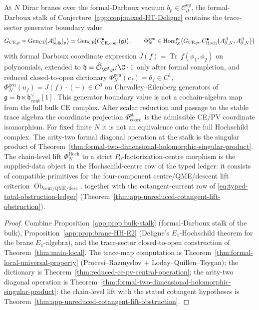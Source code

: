 \begin{thm}\label{app:thm:stalk-of-conj}
At $N$ Dirac branes over the formal-Darboux vacuum
$b_p\in\mathcal{C}^{\mathrm{op}}_\partial$, the formal-Darboux stalk
of Conjecture~\ref{app:conj:mixed-HT-Deligne} contains the
trace-sector generator boundary value
\[
  G_{\mathrm{CE},p}=
  \operatorname{Gen}_{\mathrm{CE}}\!
  \bigl(\mathcal A^{\mathrm{cl}}_{\mathrm{bulk}}|_p\bigr)
   \simeq
	   \operatorname{Gen}_{\mathrm{CE}}\!
	   \bigl(C^\bullet_{\mathrm{CE},\mathrm{cont}}(\mathfrak g)\bigr),
  \qquad
  \Phi_N^{\mathrm{gen}}\in
  \operatorname{Hom}^{\mathrm{gr}}_\C\!\left(
    G_{\mathrm{CE},p},
    C^\bullet_{\mathrm{Hoch}}\bigl(A^{\mathrm{cl}}_{\partial,N},
    A^{\mathrm{cl}}_{\partial,N}\bigr)
  \right)
\]
with formal Darboux coordinate expression
\(J(f)=\overline{\operatorname{Tr}\,f(\phi_1,\phi_2)}\) on polynomials,
extended to
\(\mathfrak h=\widehat{\mathcal O}_{\C^2,p}/\C\cdot 1\) only after
formal completion, and reduced closed-to-open dictionary
\(\Phi_N^{\mathrm{gen}}(c_f)=\theta_f\in C^1\),
\(\Phi_N^{\mathrm{gen}}(u_f)=J(f)\cdot(-)\in C^0\) on
Chevalley--Eilenberg generators of
$\mathfrak g=\mathfrak h\ltimes\mathfrak h^\vee_{\mathrm{cont}}[1]$.
This generator boundary value is not a cochain-algebra map from the
full bulk CE complex.  After scalar reduction and passage to the
stable trace algebra the coordinate projection
\(\Phi_{\mathrm{coord}}^{\mathrm{st}}\) is the admissible CE/PV
coordinate isomorphism.  For fixed finite \(N\) it is not an equivalence
onto the full Hochschild complex.
The arity-two formal diagonal operation at the stalk is the singular
product of
Theorem~\ref{thm:formal-two-dimensional-holomorphic-singular-product}.
The chain-level lift \(\Phi_N^{\mathrm{Hoch}}\) to a strict
\(P_0\)-factorization-centre morphism is the supplied-data object in the
Hochschild-centre row of the typed ledger: it consists of compatible
primitives for the four-component centre/QME/descent lift criterion
\(\operatorname{Ob}_{\mathrm{cent/QME/desc}}\), together with the
cotangent-current row of \eqref{eq:typed-total-obstruction-ledger}
(Theorem~\ref{thm:app-unreduced-cotangent-lift-obstruction}).
\end{thm}

\begin{proof}
Combine Proposition~\ref{app:prop:bulk-stalk} (formal-Darboux stalk of
the bulk),
Proposition~\ref{app:prop:brane-HH-E2} (Deligne's $E_1$-Hochschild
theorem for the brane $E_1$-algebra), and the trace-sector
closed-to-open construction of Theorem~\ref{thm:main-local}.  The
trace-map computation is
Theorem~\ref{thm:formal-local-universal-property} (Procesi--Razmyslov +
Loday--Quillen--Tsygan); the dictionary is
Theorem~\ref{thm:reduced-ce-pv-central-operation}; the arity-two
diagonal operation is
Theorem~\ref{thm:formal-two-dimensional-holomorphic-singular-product}; the
chain-level lift with the stated cotangent hypotheses is
Theorem~\ref{thm:app-unreduced-cotangent-lift-obstruction}.
\end{proof}

